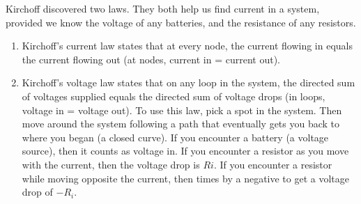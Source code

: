 Kirchoff discovered two laws. They both help us find current in a system, provided we know the voltage of any batteries, and the resistance of any resistors. 
\begin{enumerate}
	\item Kirchoff's current law states that at every node, the current flowing in equals the current flowing out (at nodes, current in = current out). 
	\item Kirchoff's voltage law states that on any loop in the system, the directed sum of voltages supplied equals the directed sum of voltage drops (in loops, voltage in = voltage out). To use this law, pick a spot in the system.  Then move around the system following a path that eventually gets you back to where you began (a closed curve). If you encounter a battery (a voltage source), then it counts as voltage in.  If you encounter a resistor as you move with the current, then the voltage drop is $Ri$.  If you encounter a resistor while moving opposite the current, then times by a negative to get a voltage drop of $-R_i$.
\end{enumerate}

